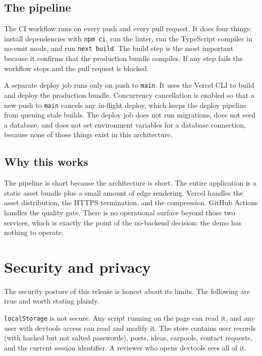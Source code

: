\documentclass[a4paper,11pt]{article}
\begin{document}
\subsection{The pipeline}

The CI workflow runs on every push and every pull request. It does four
things: install dependencies with \texttt{npm ci}, run the linter, run the
TypeScript compiler in no-emit mode, and run \texttt{next build}. The build
step is the most important because it confirms that the production bundle
compiles. If any step fails the workflow stops and the pull request is
blocked.

A separate deploy job runs only on push to \texttt{main}. It uses the Vercel
CLI to build and deploy the production bundle. Concurrency cancellation is
enabled so that a new push to \texttt{main} cancels any in-flight deploy,
which keeps the deploy pipeline from queuing stale builds. The deploy job
does not run migrations, does not seed a database, and does not set
environment variables for a database connection, because none of those things
exist in this architecture.

\subsection{Why this works}

The pipeline is short because the architecture is short. The entire
application is a static asset bundle plus a small amount of edge rendering.
Vercel handles the asset distribution, the HTTPS termination, and the
compression. GitHub Actions handles the quality gate. There is no operational
surface beyond those two services, which is exactly the point of the
no-backend decision: the demo has nothing to operate.


\section{Security and privacy}
\label{sec:security}

The security posture of this release is honest about its limits. The
following are true and worth stating plainly.

\texttt{localStorage} is not secure. Any script running on the page can read
it, and any user with devtools access can read and modify it. The store
contains user records (with hashed but not salted passwords), posts, ideas,
carpools, contact requests, and the current session identifier. A reviewer
who opens devtools sees all of it.
\end{document}
